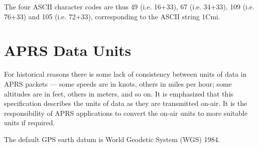 The four ASCII character codes are thus 49 (i.e. 16+33), 67 (i.e. 34+33), 109
(i.e. 76+33) and 105 (i.e. 72+33), corresponding to the ASCII string 1Cmi.

\section{APRS Data Units}

For historical reasons there is some lack of consistency between units of data
in APRS packets — some speeds are in knots, others in miles per hour; some
altitudes are in feet, others in meters, and so on. It is emphasized that this
specification describes the units of data as they are transmitted on-air. It is
the responsibility of APRS applications to convert the on-air units to more
suitable units if required.

The default GPS earth datum is World Geodetic System (WGS) 1984.


